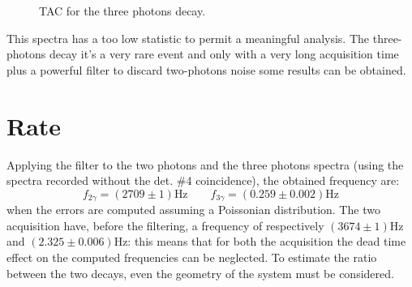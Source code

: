 \documentclass[11pt,a4 paper]{article}
\begin{document}
\begin{figure}[H]
    \centering
    \caption{TAC for the three photons decay.}
    \label{fig:tac:3gamma}
\end{figure}


This spectra has a too low statistic to permit a meaningful analysis. The three-photons decay it's a very rare event and only with a very long acquisition time plus a powerful filter to discard two-photons noise some results can be obtained.

\section{Rate}

Applying the filter to the two photons and the three photons spectra (using the spectra recorded without the det. \#4 coincidence), the obtained frequency are:
\begin{equation}
    f_{2\gamma} = (2709 \pm 1)\si{\hertz} \qquad f_{3\gamma} = (0.259 \pm 0.002)\si{\hertz} 
\end{equation}
when the errors are computed assuming a Poissonian distribution. The two acquisition have, before the filtering, a frequency of respectively $(3674\pm1)\si{\hertz}$ and $(2.325\pm0.006)\si{\hertz}$: this means that for both the acquisition the dead time effect on the computed frequencies can be neglected. To estimate the ratio between the two decays, even the geometry of the system must be considered.
\end{document}
